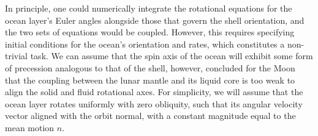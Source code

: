 \documentclass[pdflatex,sn-mathphys-num]{sn-jnl}%
\theoremstyle{thmstyleone}%
\theoremstyle{thmstyletwo}%
\theoremstyle{thmstylethree}%
\let\unit\si
\renewcommand{\vec}[1]{\boldsymbol{#1}}
\begin{document}
In principle, one could numerically integrate the rotational equations for the ocean layer's Euler angles alongside those that govern the shell orientation, and the two sets of equations would be coupled. However, this requires specifying initial conditions for the ocean's orientation and rates, which constitutes a non-trivial task. 
We can assume that the spin axis of the ocean will exhibit some form of precession analogous to that of the shell, however,
\cite{1967JGR....72.3135G} concluded for the Moon that the coupling between the lunar mantle and its liquid core is too weak to align the solid and fluid rotational axes. %
%
For simplicity, we will assume that the ocean layer rotates uniformly with zero obliquity, such that its angular velocity vector aligned with the orbit normal, with a constant magnitude equal to the mean motion $n$.





\end{document}
